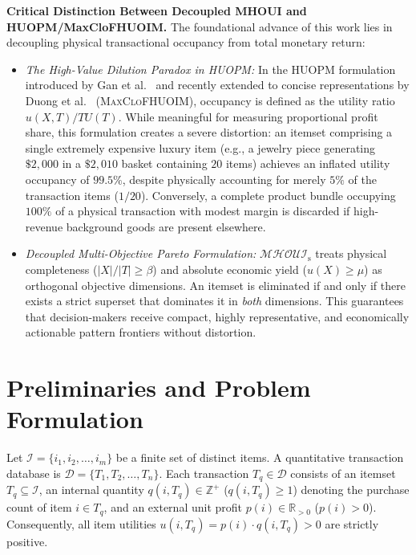 \documentclass[runningheads]{llncs}
\newcommand{\MHOUI}{\ensuremath{\mathcal{MHOUI}_{\mathrm{s}}}}
\begin{document}
\noindent
\textbf{Critical Distinction Between Decoupled MHOUI and HUOPM/MaxCloFHUOIM.}
The foundational advance of this work lies in decoupling physical transactional occupancy from total monetary return:
\begin{itemize}
    \item \emph{The High-Value Dilution Paradox in HUOPM:} In the HUOPM formulation introduced by Gan et al.~\cite{gan2020huopm} and recently extended to concise representations by Duong et al.~\cite{duong2024efficient} (\textsc{MaxCloFHUOIM}), occupancy is defined as the utility ratio $u(X, T)/TU(T)$. While meaningful for measuring proportional profit share, this formulation creates a severe distortion: an itemset comprising a single extremely expensive luxury item (e.g., a jewelry piece generating $\$2{,}000$ in a $\$2{,}010$ basket containing $20$ items) achieves an inflated utility occupancy of $99.5\%$, despite physically accounting for merely $5\%$ of the transaction items ($1/20$). Conversely, a complete product bundle occupying $100\%$ of a physical transaction with modest margin is discarded if high-revenue background goods are present elsewhere.
    \item \emph{Decoupled Multi-Objective Pareto Formulation:} \MHOUI{} treats physical completeness ($|X|/|T| \ge \beta$) and absolute economic yield ($u(X) \ge \mu$) as orthogonal objective dimensions. An itemset is eliminated if and only if there exists a strict superset that dominates it in \emph{both} dimensions. This guarantees that decision-makers receive compact, highly representative, and economically actionable pattern frontiers without distortion.
\end{itemize}

\section{Preliminaries and Problem Formulation}
\label{sec:problem}

Let $\mathcal{I} = \{i_1, i_2, \dots, i_m\}$ be a finite set of distinct items. A quantitative transaction database is $\mathcal{D} = \{T_1, T_2, \dots, T_n\}$. Each transaction $T_q \in \mathcal{D}$ consists of an itemset $T_q \subseteq \mathcal{I}$, an internal quantity $q(i, T_q) \in \mathbb{Z}^+$ ($q(i, T_q) \ge 1$) denoting the purchase count of item $i \in T_q$, and an external unit profit $p(i) \in \mathbb{R}_{>0}$ ($p(i) > 0$). Consequently, all item utilities $u(i, T_q) = p(i) \cdot q(i, T_q) > 0$ are strictly positive.
\end{document}
